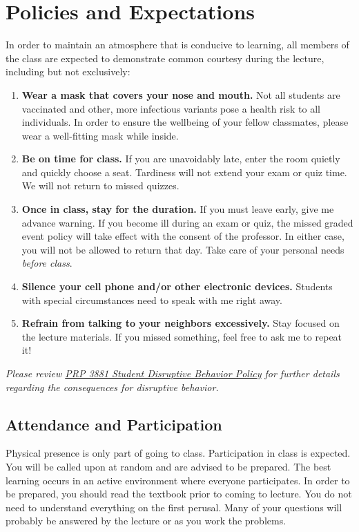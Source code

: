 \documentclass[11pt,letterpaper]{article}
\begin{document}
\section{Policies and Expectations}
In order to maintain an atmosphere that is conducive to learning, all members
of the class are expected to demonstrate common courtesy during the lecture,
including but not exclusively:
\begin{enumerate}
	\item \textbf{Wear a mask that covers your nose and mouth.} Not all
		students are vaccinated and other, more infectious variants pose
		a health risk to all individuals. In order to ensure the
		wellbeing of your fellow classmates, please wear a well-fitting
		mask while inside.
	\item \textbf{Be on time for class.} If you are unavoidably late, enter
		the room quietly and quickly choose a seat.  Tardiness will not
		extend your exam or quiz time. We will not return to missed
		quizzes.
	\item \textbf{Once in class, stay for the duration.} If you must leave
		early, give me advance warning. If you become ill during an exam
		or quiz, the missed graded event policy will take effect with
		the consent of the professor. In either case, you will not be
		allowed to return that day. Take care of your personal needs
		\emph{before class}.
	\item \textbf{Silence your cell phone and/or other electronic devices.}
		Students with special circumstances need to speak with me right
		away.
	\item \textbf{Refrain from talking to your neighbors excessively.} Stay
		focused on the lecture materials. If you missed something, feel
		free to ask me to repeat it!
\end{enumerate}
\emph{Please review
\href{https://www.bloomu.edu/prp-3881-student-disruptive-behavior-policy}{PRP 3881 Student
Disruptive Behavior Policy} for further details regarding the consequences for
disruptive behavior.}

\subsection{Attendance and Participation}
Physical presence is only part of going to class. Participation in class is
expected. You will be called upon at random and are advised to be prepared.
The best learning occurs in an active environment where everyone participates.
In order to be prepared, you should read the textbook prior to coming to
lecture.  You do not need to understand everything on the first perusal. Many
of your questions will probably be answered by the lecture or as you work the
problems.
\end{document}
